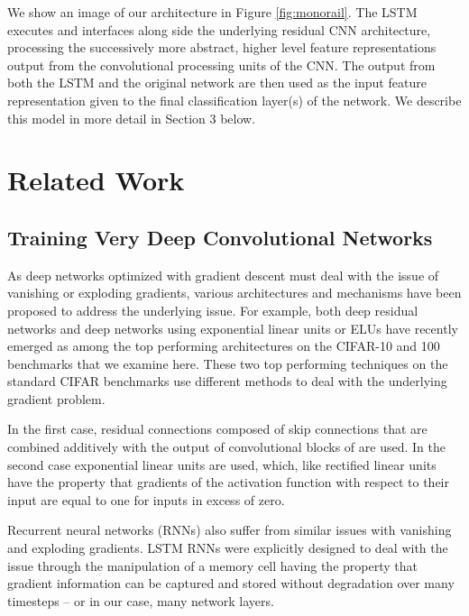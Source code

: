 \documentclass{article}
\begin{document}
We show an image of our architecture in Figure \ref{fig:monorail}. The LSTM executes and interfaces along side the underlying residual CNN architecture, processing the successively more abstract, higher level feature representations output from the convolutional processing units of the CNN. The output from both the LSTM and the original network are then used as the input feature representation given to the final classification layer(s) of the network. We describe this model in more detail in Section 3 below.




\section{Related Work}

\subsection{Training Very Deep Convolutional Networks} %

As deep networks optimized with gradient descent must deal with the issue of vanishing or exploding gradients, various architectures and mechanisms have been proposed to address the underlying issue. For example, both deep residual networks and deep networks using exponential linear units or ELUs have recently emerged as among the top performing architectures on the CIFAR-10 and 100 benchmarks that we examine here. These two top performing techniques on the standard CIFAR benchmarks use different methods to deal with the underlying gradient problem.

In the first case, residual connections composed of skip connections that are combined additively with the output of convolutional blocks of are used. In the second case exponential linear units are used, which, like rectified linear units have the property that gradients of the activation function with respect to their input are equal to one for inputs in excess of zero.

Recurrent neural networks (RNNs) also suffer from similar issues with vanishing and exploding gradients. LSTM RNNs were explicitly designed to deal with the issue through the manipulation of a memory cell having the property that gradient information can be captured and stored without degradation over many timesteps -- or in our case, many network layers.
\end{document}
